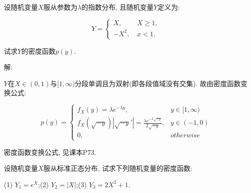 \documentclass[standard]{ExBook}
\begin{document}
\begin{qitems}
\vspace{-5em}

    \begin{bbox}
    \begin{shaded}
        \qitem
设随机变量$X$服从参数为$\lambda$的指数分布, 且随机变量$Y$定义为:
\vspace{-2em}
\begin{center}
\begin{equation}
    Y=
    \left\{
    \begin{array}{cl}
        \nonumber
        X,\ &X \geq 1,\\
        -X^2,\ &x < 1.
    \end{array}
    \right.
\end{equation}
\end{center}
试求$Y$的密度函数$p(y)$.
    \end{shaded}
    \end{bbox}

\vspace{-5em}

    \begin{bbox}
解: 

$Y$在$X\in(0,1)$与$[1,\infty)$分段单调且为双射(即各段值域没有交集). 故由密度函数变换公式:
\vspace{-2em}
\begin{center}
\begin{equation}
    p(y)=
    \left\{
    \begin{array}{cl}
        \nonumber
        f_{X}(y)=\lambda e^{-\lambda y}, &y\in[1,\infty)\\
        f_{X}(\sqrt{-y})|\sqrt{-y}'|=\displaystyle\frac{\lambda e^{-\lambda\sqrt{-y}}}{2\sqrt{-y}}, &y\in(-1,0)\\
        0, &otherwise
    \end{array}
    \right.
\end{equation}
\end{center}
\textcolor{themeColor}{\selectfont {} 密度函数变换公式, 见课本P73.}
    \end{bbox}

\vspace{-5em}

    \begin{bbox}
    \begin{shaded}
        \qitem
设随机变量$X$服从标准正态分布, 试求下列随机变量的密度函数:

(1) $Y_{1}=e^X$;\qquad(2) $Y_{2}=|X|$;\qquad(3) $Y_{3}=2X^2+1$.
    \end{shaded}
    \end{bbox}


\end{qitems}
\end{document}
